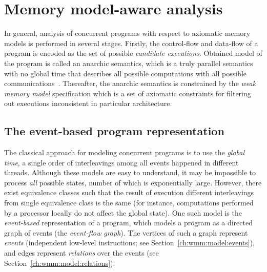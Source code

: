 \chapter{Memory model-aware analysis}
\label{ch:wmm}

In general, analysis of concurrent programs with respect to axiomatic memory models is performed in several stages. Firstly, the control-flow and data-flow of a program is encoded as the set of possible \textit{candidate executions}. %
Obtained model of the program is called an anarchic semantics, which is a truly parallel semantics with no global time that describes all possible computations with all possible communications~\cite{alglave2016syntax}. Thereafter, the anarchic semantics is constrained by the \textit{weak memory model} specification which is a set of axiomatic constraints for filtering out executions inconsistent in particular architecture.


\section{The event-based program representation}
\label{ch:wmm:event}

The classical approach for modeling concurrent programs is to use the \textit{global time}, a single order of interleavings among all events happened in different threads.
Although these models are easy to understand, it may be impossible to process \textit{all} possible states, number of which is exponentially large.
However, there exist equivalence classes such that the result of execution different interleavings from single equivalence class is the same (for instance, computations performed by a processor locally do not affect the global state).
One such model is the \textit{event-based} representation of a program, which models a program as a directed graph of events (the \textit{event-flow graph}).
The vertices of such a graph represent \textit{events} (independent low-level instructions; see Section~\ref{ch:wmm:model:events}), and edges represent \textit{relations} over the events (see Section~\ref{ch:wmm:model:relations}).


